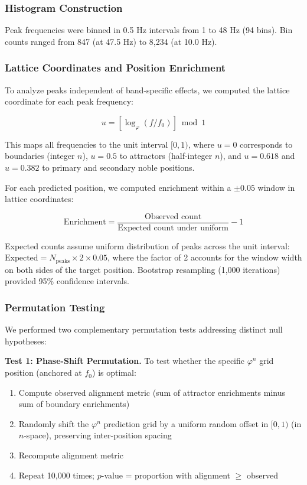 \documentclass[11pt,a4paper]{article}
\newcommand{\phisym}{\varphi}
\newcommand{\fzero}{f_0}
\begin{document}
\subsubsection{Histogram Construction}

Peak frequencies were binned in 0.5 Hz intervals from 1 to 48 Hz (94 bins). Bin counts ranged from 847 (at 47.5 Hz) to 8,234 (at 10.0 Hz).

\subsubsection{Lattice Coordinates and Position Enrichment}

To analyze peaks independent of band-specific effects, we computed the lattice coordinate for each peak frequency:

\begin{equation}
u = \left[\log_\phisym(f/\fzero)\right] \bmod 1
\end{equation}

\noindent This maps all frequencies to the unit interval $[0, 1)$, where $u = 0$ corresponds to boundaries (integer $n$), $u = 0.5$ to attractors (half-integer $n$), and $u = 0.618$ and $u = 0.382$ to primary and secondary noble positions.

For each predicted position, we computed enrichment within a $\pm 0.05$ window in lattice coordinates:

\begin{equation}
\text{Enrichment} = \frac{\text{Observed count}}{\text{Expected count under uniform}} - 1
\end{equation}

\noindent Expected counts assume uniform distribution of peaks across the unit interval: $\text{Expected} = N_{\text{peaks}} \times 2 \times 0.05$, where the factor of 2 accounts for the window width on both sides of the target position. Bootstrap resampling (1,000 iterations) provided 95\% confidence intervals.

\subsubsection{Permutation Testing}

We performed two complementary permutation tests addressing distinct null hypotheses:

\textbf{Test 1: Phase-Shift Permutation.} To test whether the specific $\phisym^n$ grid position (anchored at $\fzero$) is optimal:
\begin{enumerate}
    \item Compute observed alignment metric (sum of attractor enrichments minus sum of boundary enrichments)
    \item Randomly shift the $\phisym^n$ prediction grid by a uniform random offset in $[0, 1)$ (in $n$-space), preserving inter-position spacing
    \item Recompute alignment metric
    \item Repeat 10,000 times; $p$-value = proportion with alignment $\geq$ observed
\end{enumerate}
\end{document}
